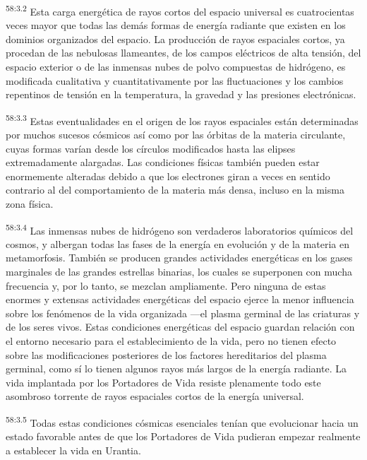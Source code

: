 \par
\textsuperscript{58:3.2} Esta carga energética de rayos cortos del espacio universal es cuatrocientas veces mayor que todas las demás formas de energía radiante que existen en los dominios organizados del espacio. La producción de rayos espaciales cortos, ya procedan de las nebulosas llameantes, de los campos eléctricos de alta tensión, del espacio exterior o de las inmensas nubes de polvo compuestas de hidrógeno, es modificada cualitativa y cuantitativamente por las fluctuaciones y los cambios repentinos de tensión en la temperatura, la gravedad y las presiones electrónicas.

\par
\textsuperscript{58:3.3} Estas eventualidades en el origen de los rayos espaciales están determinadas por muchos sucesos cósmicos así como por las órbitas de la materia circulante, cuyas formas varían desde los círculos modificados hasta las elipses extremadamente alargadas. Las condiciones físicas también pueden estar enormemente alteradas debido a que los electrones giran a veces en sentido contrario al del comportamiento de la materia más densa, incluso en la misma zona física.

\par
\textsuperscript{58:3.4} Las inmensas nubes de hidrógeno son verdaderos laboratorios químicos del cosmos, y albergan todas las fases de la energía en evolución y de la materia en metamorfosis. También se producen grandes actividades energéticas en los gases marginales de las grandes estrellas binarias, los cuales se superponen con mucha frecuencia y, por lo tanto, se mezclan ampliamente. Pero ninguna de estas enormes y extensas actividades energéticas del espacio ejerce la menor influencia sobre los fenómenos de la vida organizada ---el plasma germinal de las criaturas y de los seres vivos. Estas condiciones energéticas del espacio guardan relación con el entorno necesario para el establecimiento de la vida, pero no tienen efecto sobre las modificaciones posteriores de los factores hereditarios del plasma germinal, como sí lo tienen algunos rayos más largos de la energía radiante. La vida implantada por los Portadores de Vida resiste plenamente todo este asombroso torrente de rayos espaciales cortos de la energía universal.

\par
\textsuperscript{58:3.5} Todas estas condiciones cósmicas esenciales tenían que evolucionar hacia un estado favorable antes de que los Portadores de Vida pudieran empezar realmente a establecer la vida en Urantia.

